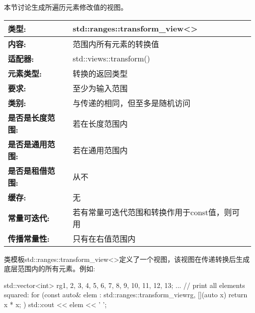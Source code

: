 

本节讨论生成所遍历元素修改值的视图。


\begin{longtable}[c]{|l|l|}
\hline
\textbf{类型:}                 & std::ranges::transform\_view\textless{}\textgreater{} \\ \hline
\endfirsthead
%
\endhead
%
\textbf{内容:}              & 范围内所有元素的转换值      \\ \hline
\textbf{适配器:}              & std::views::transform()                               \\ \hline
\textbf{元素类型:}         & 转换的返回类型               \\ \hline
\textbf{要求:}             & 至少为输入范围                                  \\ \hline
\textbf{类别:}             & 与传递的相同，但至多是随机访问              \\ \hline
\textbf{是否是长度范围:}       & 若在长度范围内                                     \\ \hline
\textbf{是否是通用范围:}      & 若在通用范围内                                    \\ \hline
\textbf{是否是租借范围:}    & 从不                                                 \\ \hline
\textbf{缓存:}               & 无                                               \\ \hline
\textbf{常量可迭代:} & 若有常量可迭代范围和转换作用于const值，则可用 \\ \hline
\textbf{传播常量性:} & 只有在右值范围内                               \\ \hline
\end{longtable}

类模板std::ranges::transform\_view<>定义了一个视图，该视图在传递转换后生成底层范围内的所有元素。例如:

\begin{cpp}
std::vector<int> rg{1, 2, 3, 4, 5, 6, 7, 8, 9, 10, 11, 12, 13};
...
// print all elements squared:
for (const auto& elem : std::ranges::transform_view{rg, [](auto x) {
							return x * x;
					}}) {
	std::cout << elem << ' ';
}
\end{cpp}


